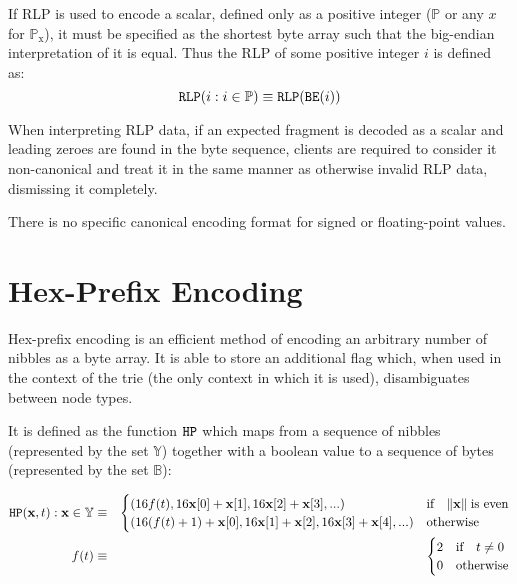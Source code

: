 \documentclass[9pt,oneside]{amsart}
\begin{document}
If RLP is used to encode a scalar, defined only as a positive integer ($\mathbb{P}$ or any $x$ for $\mathbb{P}_{\mathrm{x}}$), it must be specified as the shortest byte array such that the big-endian interpretation of it is equal. Thus the RLP of some positive integer $i$ is defined as:
\begin{equation}
\mathtt{\tiny RLP}(i : i \in \mathbb{P}) \equiv \mathtt{\tiny RLP}(\mathtt{\tiny BE}(i))
\end{equation}

When interpreting RLP data, if an expected fragment is decoded as a scalar and leading zeroes are found in the byte sequence, clients are required to consider it non-canonical and treat it in the same manner as otherwise invalid RLP data, dismissing it completely.

There is no specific canonical encoding format for signed or floating-point values.

\section{Hex-Prefix Encoding}\label{app:hexprefix}
Hex-prefix encoding is an efficient method of encoding an arbitrary number of nibbles as a byte array. It is able to store an additional flag which, when used in the context of the trie (the only context in which it is used), disambiguates between node types.

It is defined as the function $\mathtt{\tiny HP}$ which maps from a sequence of nibbles (represented by the set $\mathbb{Y}$) together with a boolean value to a sequence of bytes (represented by the set $\mathbb{B}$):

\begin{eqnarray}
\mathtt{\tiny HP}(\mathbf{x}, t): \mathbf{x} \in \mathbb{Y} & \equiv & \begin{cases}
(16f(t), 16\mathbf{x}[0] + \mathbf{x}[1], 16\mathbf{x}[2] + \mathbf{x}[3], ...) &
\text{if} \quad \lVert \mathbf{x} \rVert \; \text{is even} \\
(16(f(t) + 1) + \mathbf{x}[0], 16\mathbf{x}[1] + \mathbf{x}[2], 16\mathbf{x}[3] + \mathbf{x}[4], ...) &
\text{otherwise}
\end{cases} \\
f(t) & \equiv & \begin{cases} 2 & \text{if} \quad t \neq 0 \\ 0 & \text{otherwise} \end{cases}
\end{eqnarray}
\end{document}
